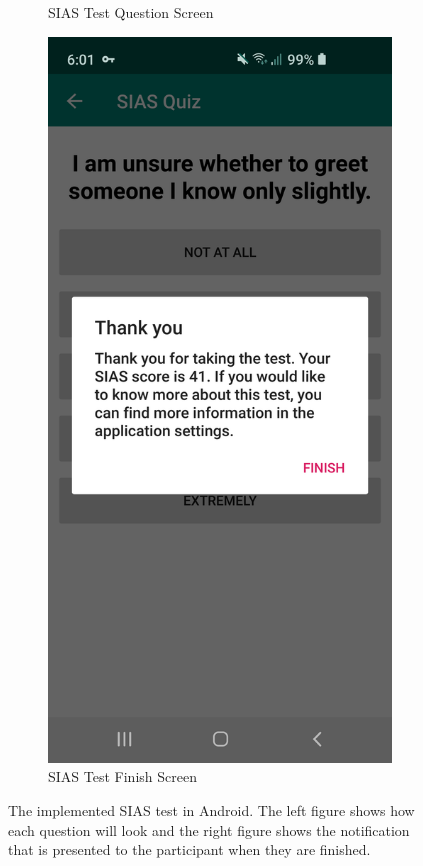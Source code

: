 \documentclass{l4proj}
\begin{document}
\begin{figure}[htbp]
\begin{subfigure}[b]{0.30\textwidth}
        \caption{SIAS Test Question Screen}
        \label{fig:main_screen_1_sias}
    \end{subfigure} \quad
    \begin{subfigure}[b]{0.30\textwidth}
        \includegraphics[width=\textwidth]{images/sias-done.pdf}
        \caption{SIAS Test Finish Screen}
        \label{fig:test_screen_1_done}
    \end{subfigure}
    \caption{The implemented SIAS test in Android. The left figure shows how each question will look and the right figure shows the notification that is presented to the participant when they are finished.}\label{fig:sias-android}
\end{figure}
\end{document}
